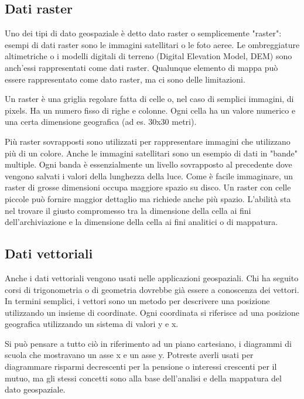 \subsection{Dati raster}\label{label_rasterdata}

Uno dei tipi di dato geospaziale è detto dato raster o semplicemente "raster": 
esempi di dati raster sono le immagini satellitari o le foto aeree. 
Le ombreggiature altimetriche o i modelli digitali di terreno (Digital Elevation Model, DEM)
sono anch'essi rappresentati come dati raster. Qualunque elemento di mappa può essere
rappresentato come dato raster, ma ci sono delle limitazioni.

Un raster è una griglia regolare fatta di celle o, nel caso di semplici
immagini, di pixels. Ha un numero fisso di righe e colonne.
Ogni cella ha un valore numerico e una certa dimensione geografica
(ad es. 30x30 metri).

Più raster sovrapposti sono utilizzati per rappresentare immagini che utilizzano
più di un colore. Anche le immagini satellitari sono un esempio
di dati in "bande" multiple. Ogni banda è essenzialmente un livello sovrapposto
al precedente dove vengono salvati i valori della lunghezza della luce. Come è
facile immaginare, un raster di grosse dimensioni occupa maggiore spazio su disco.
Un raster con celle piccole può fornire maggior dettaglio ma richiede anche più spazio.
L'abilità sta nel trovare il giusto compromesso tra la dimensione della cella
ai fini dell'archiviazione e la dimensione della cella ai fini analitici
o di mappatura.

\subsection{Dati vettoriali}\label{label_vectordata}

Anche i dati vettoriali vengono usati nelle applicazioni geospaziali.
Chi ha seguito corsi di trigonometria o di geometria dovrebbe già essere a conoscenza dei vettori.
In termini semplici, i vettori sono un metodo per descrivere
una posizione utilizzando un insieme di coordinate. Ogni coordinata
si riferisce ad una posizione geografica utilizzando un sistema di valori y e x.

Si può pensare a tutto ciò in riferimento ad un piano cartesiano,
i diagrammi di scuola che mostravano un asse x e un asse y. Potreste
averli usati per diagrammare risparmi decrescenti per la pensione
o interessi crescenti per il mutuo, ma gli stessi concetti sono alla
base dell'analisi e della mappatura del dato geospaziale.

